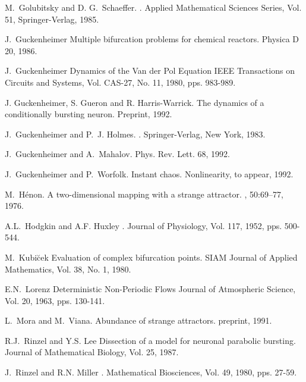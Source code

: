 \begin{thebibliography}{99}
M.~Golubitsky and D. G.~Schaeffer.
.
\newblock Applied Mathematical Sciences Series, Vol. 51, Springer-Verlag,  1985.

 J.~Guckenheimer
\newblock Multiple bifurcation problems for chemical reactors.
\newblock Physica D 20, 1986.

J.~Guckenheimer
\newblock Dynamics of the Van der Pol Equation
\newblock IEEE Transactions on Circuits and Systems, Vol. CAS-27, No. 11, 1980, pps. 983-989.

J. Guckenheimer, S. Gueron and R. Harris-Warrick.
\newblock The dynamics of a conditionally bursting neuron.
\newblock Preprint, 1992.

J.~Guckenheimer and P.~J. Holmes.
.
\newblock Springer-Verlag, New York, 1983.

J.~Guckenheimer and A.~Mahalov.
\newblock Phys. Rev. Lett. 68, 1992.

J.~Guckenheimer and P.~Worfolk.
\newblock Instant chaos.
\newblock Nonlinearity, to appear, 1992.

M.~H\'{e}non.
\newblock A two-dimensional mapping with a strange attractor.
, 50:69--77, 1976.

A.L.~Hodgkin and A.F. Huxley
. 
\newblock Journal of Physiology, Vol. 117, 1952, pps. 500-544.

M.~Kubi\u{c}ek
\newblock Evaluation of complex bifurcation points.
\newblock SIAM Journal of Applied Mathematics, Vol. 38, No. 1, 1980.

E.N.~Lorenz
\newblock Deterministic Non-Periodic Flows
\newblock Journal of Atmospheric Science, Vol. 20, 1963, pps. 130-141.

L.~Mora and M.~Viana.
\newblock Abundance of strange attractors.
\newblock preprint, 1991.

R.J.~Rinzel and Y.S. Lee
\newblock Dissection of a model for neuronal parabolic bursting.
Journal of Mathematical Biology, Vol. 25, 1987.

J.~Rinzel and R.N. Miller
.
\newblock Mathematical Biosciences, Vol. 49, 1980, pps. 27-59.


\end{thebibliography}
